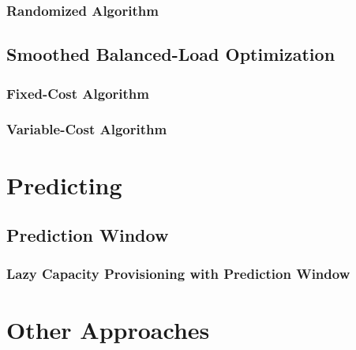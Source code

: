 \subsubsection{Randomized Algorithm}

\subsection{Smoothed Balanced-Load Optimization}

\subsubsection{Fixed-Cost Algorithm}

\subsubsection{Variable-Cost Algorithm}

\section{Predicting}

\subsection{Prediction Window}

\subsubsection{Lazy Capacity Provisioning with Prediction Window}

\section{Other Approaches}
